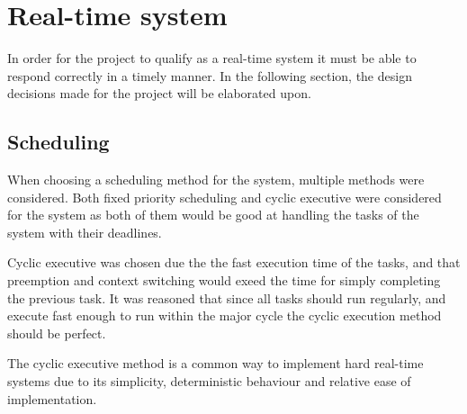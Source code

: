 \section{Real-time system}\label{Design:RTS} 
In order for the project to qualify as a real-time system it must be able to respond correctly in a timely manner. 
In the following section, the design decisions made for the project will be elaborated upon. 


\subsection{Scheduling}\label{Design:Scheduling}
When choosing a scheduling method for the system, multiple methods were considered. 
Both fixed priority scheduling and cyclic executive were considered for the system as both of them would be good at handling the tasks of the system with their deadlines.

Cyclic executive was chosen due the the fast execution time of the tasks, and that preemption and context switching would exeed the time for simply completing the previous task. 
It was reasoned that since all tasks should run regularly, and execute fast enough to run within the major cycle the cyclic execution method should be perfect. 

The cyclic executive method is a common way to implement hard real-time systems due to its simplicity, deterministic behaviour and relative ease of implementation\cite{CyclicExecutionKimLarsen}.